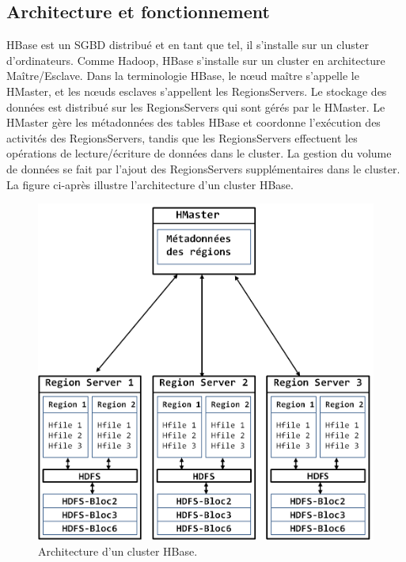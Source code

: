 \subsection{Architecture et fonctionnement}

HBase est un SGBD distribué et en tant que tel, il s'installe sur un cluster d'ordinateurs. Comme Hadoop, HBase s'installe sur un cluster en architecture Maître/Esclave. Dans la terminologie HBase, le nœud maître s'appelle le HMaster, et les nœuds esclaves s'appellent les RegionsServers. Le stockage des données est distribué sur les RegionsServers qui sont gérés par le HMaster. Le HMaster gère les métadonnées des tables HBase et coordonne l'exécution des activités des RegionsServers, tandis que les RegionsServers effectuent les opérations de lecture/écriture de données dans le cluster. La gestion du volume de données se fait par l'ajout des RegionsServers supplémentaires dans le cluster. La figure ci-après illustre l'architecture d'un cluster HBase.

\begin{figure}[h]
	\centering
    \includegraphics[scale=0.7]{img/part2/2.2}
    \caption{Architecture d'un cluster HBase.}
\end{figure}

